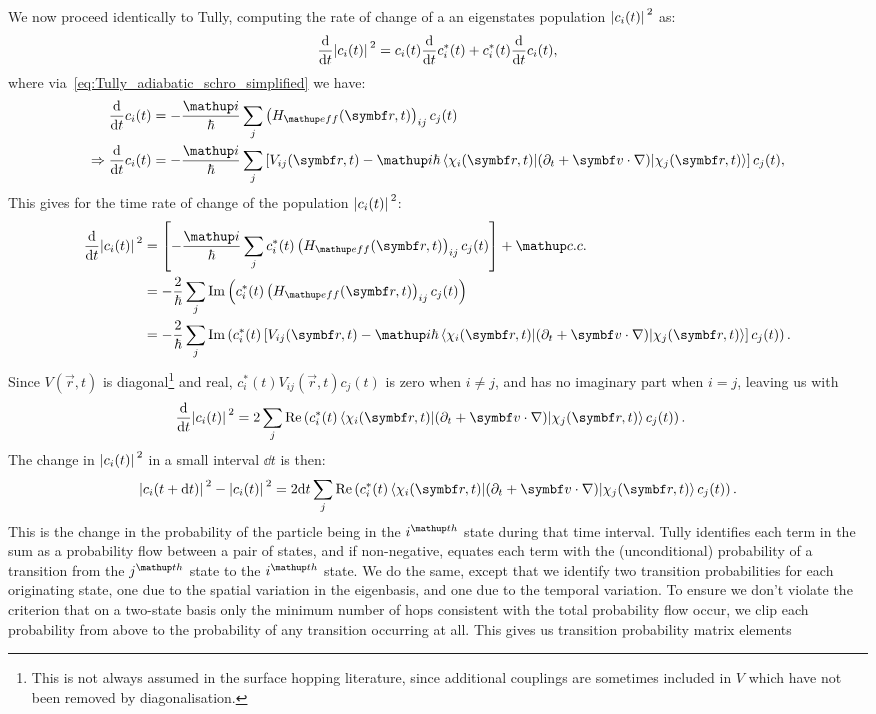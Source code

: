We now proceed identically to Tully, computing the rate of change of a an eigenstates population $\abs{c_i(t)}^2$ as:
\begin{align}
\dv{t}\abs{c_i(t)}^2 = c_i(t) \dv{t}c_i^*(t) + c_i^*(t) \dv{t}c_i(t),
\end{align}
where via~\eqref{eq:Tully_adiabatic_schro_simplified} we have:
\begin{align}
\dv{t}c_i(t) &= -\frac\ii\hbar\sum_j \left(H_\up{eff}(\vec r, t)\right)_{ij} c_j(t)\\
\Rightarrow \dv{t}c_i(t) &= -\frac\ii\hbar \sum_j\left[V_{ij}(\vec r, t)
  - \ii\hbar\matrixel{\chi_i(\vec r, t)}{(\partial_t + \vec v\cdot\nabla)}{\chi_j(\vec r, t)}
 \right] c_j(t),
\end{align}
This gives for the time rate of change of the population $\abs{c_i(t)}^2$:
\begin{align}
\dv{t}\abs{c_i(t)}^2 &= \left[-\frac\ii\hbar \sum_j c_i^*(t) \left(H_\up{eff}(\vec r, t)\right)_{ij} c_j(t)\right] + \up{c.c.}\\
&= -\frac2\hbar\sum_j\im\left(c_i^*(t) \left(H_\up{eff}(\vec r, t)\right)_{ij} c_j(t)\right)\label{eq:fewest_switches_Heff}\\
&= -\frac2\hbar\sum_j\im\left(c_i^*(t)
\left[V_{ij}(\vec r, t)
  - \ii\hbar\matrixel{\chi_i(\vec r, t)}{(\partial_t + \vec v\cdot\nabla)}{\chi_j(\vec r, t)}
 \right]
 c_j(t)\right).
\end{align}
Since $V(\vec r, t)$ is diagonal\footnote{This is not always assumed in the surface hopping literature, since additional couplings are sometimes included in $V$ which have not been removed by diagonalisation.} and real, $c_i^*(t)V_{ij}(\vec r, t)c_j(t)$ is zero when $i\neq j$, and has no imaginary part when $i=j$, leaving us with
\begin{align}
\dv{t}\abs{c_i(t)}^2 &= 2\sum_j\re\left(c_i^*(t)
  \matrixel{\chi_i(\vec r, t)}{(\partial_t + \vec v\cdot\nabla)}{\chi_j(\vec r, t)}
 c_j(t)\right).
\end{align}
The change in $\abs{c_i(t)}^2$ in a small interval $\dd t$ is then:
\begin{align}\label{eq:Tully_change_in_prob}
\abs{c_i(t + \dd t)}^2 - \abs{c_i(t)}^2 = 2\dd t
\sum_j\re\left(c_i^*(t)
  \matrixel{\chi_i(\vec r, t)}{(\partial_t + \vec v\cdot\nabla)}{\chi_j(\vec r, t)}
 c_j(t)\right).
\end{align}
This is the change in the probability of the particle being in the $i^\up{th}$ state during that time interval. Tully identifies each term in the sum as a probability flow between a pair of states, and if non-negative, equates each term with the (unconditional) probability of a transition from the $j^\up{th}$ state to the $i^\up{th}$ state. We do the same, except that we identify two transition probabilities for each originating state, one due to the spatial variation in the eigenbasis, and one due to the temporal variation. To ensure we don't violate the criterion that on a two-state basis only the minimum number of hops consistent with the total probability flow occur, we clip each probability from above to the probability of any transition occurring at all. This gives us transition probability matrix elements
